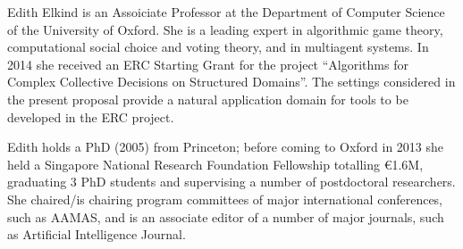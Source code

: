 \begin{participant}[PM=2,salary=8000]{Edith Elkind}
  is an Assoiciate Professor at the Department of Computer Science of the University of
  Oxford. She is a leading expert in algorithmic game theory, computational social choice
  and voting theory, and in multiagent systems. In 2014 she received an ERC Starting Grant
  for the project ``Algorithms for Complex Collective Decisions on Structured
  Domains''. The settings considered in the present proposal provide a natural application
  domain for tools to be developed in the ERC project.

  Edith holds a PhD (2005) from Princeton; before coming to Oxford in 2013 she held a
  Singapore National Research Foundation Fellowship totalling \euro 1.6M, graduating 3 PhD
  students and supervising a number of postdoctoral researchers. She chaired/is chairing
  program committees of major international conferences, such as AAMAS, and is an
  associate editor of a number of major journals, such as Artificial Intelligence Journal.
\end{participant}
